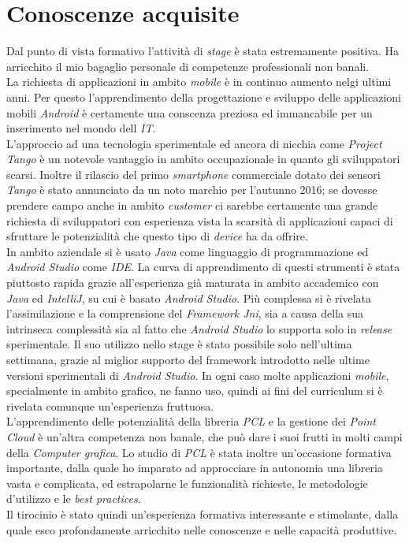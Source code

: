 \section{Conoscenze acquisite}
Dal punto di vista formativo l'attività di \emph{stage} è stata estremamente positiva. Ha arricchito il mio bagaglio personale di competenze professionali non banali.\\

\noindent
La richiesta di applicazioni in ambito \emph{mobile} è in continuo aumento nelgi ultimi anni. Per questo l'apprendimento della progettazione e sviluppo delle applicazioni mobili \emph{Android} è certamente una conscenza preziosa ed immancabile per un inserimento nel mondo dell \emph{IT}.\\
\noindent
L'approccio ad una tecnologia sperimentale ed ancora di nicchia come \emph{Project Tango} è un notevole vantaggio in ambito occupazionale in quanto gli sviluppatori scarsi. Inoltre il rilascio del primo \emph{smartphone} commerciale dotato dei sensori \emph{Tango} è stato annunciato da un noto marchio per l'autunno 2016; se dovesse prendere campo anche in ambito \emph{customer} ci sarebbe certamente una grande richiesta di sviluppatori con esperienza vista la scarsità di applicazioni capaci di sfruttare le potenzialità che questo tipo di \emph{device} ha da offrire.\\
\noindent
In ambito aziendale si è usato \emph{Java} come linguaggio di programmazione ed \emph{Android Studio} come \emph{IDE}. La curva di apprendimento di questi strumenti è stata piuttosto rapida grazie all'esperienza già maturata in ambito accademico con \emph{Java} ed \emph{IntelliJ}, su cui è basato \emph{Android Studio}. Più complessa si è rivelata l'assimilazione e la comprensione del \emph{Framework Jni}, sia a causa della sua intrinseca complessità sia al fatto che \emph{Android Studio} lo supporta solo in \emph{release} sperimentale. Il suo utilizzo nello stage è stato possibile solo nell'ultima settimana, grazie al miglior supporto del framework introdotto nelle ultime versioni sperimentali di \emph{Android Studio}. In ogni caso molte applicazioni \emph{mobile}, specialmente in ambito grafico, ne fanno uso, quindi ai fini del curriculum si è rivelata comunque un'esperienza fruttuosa.\\
\noindent
L'apprendimento delle potenzialità della libreria \emph{PCL} e la gestione dei \emph{Point Cloud} è un'altra competenza non banale, che può dare i suoi frutti in molti campi della \emph{Computer grafica}. Lo studio di \emph{PCL} è stata inoltre un'occasione formativa importante, dalla quale ho imparato ad approcciare in autonomia una libreria vasta e complicata, ed estrapolarne le funzionalità richieste, le metodologie d'utilizzo e le \emph{best practices}.\\

\noindent
Il tirocinio è stato quindi un'esperienza formativa interessante e stimolante, dalla quale esco profondamente arricchito nelle conoscenze e nelle capacità produttive.
